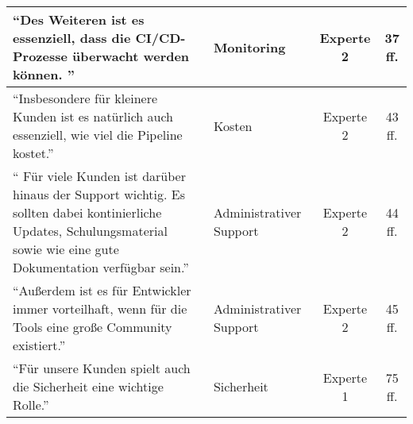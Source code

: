 \begin{longtable}{ |C{6cm}|C{3cm}|c|c| }
        \hline
        \enquote{Des Weiteren ist es essenziell, dass die CI/CD-Prozesse überwacht werden können. } & Monitoring & Experte 2 & 37 ff. \\
        \hline
        \enquote{Insbesondere für kleinere Kunden ist es natürlich auch essenziell, wie viel die Pipeline kostet.} & Kosten & Experte 2 & 43 ff. \\
        \hline
        \enquote{ Für viele Kunden ist darüber hinaus der Support wichtig. Es sollten dabei kontinierliche Updates, Schulungsmaterial sowie wie eine gute Dokumentation verfügbar sein.} & Administrativer Support & Experte 2 & 44 ff. \\
        \hline
        \enquote{Außerdem ist es für Entwickler immer vorteilhaft, wenn für die Tools eine große Community existiert.} & Administrativer Support & Experte 2 & 45 ff. \\
        \hline
        \enquote{Für unsere Kunden spielt auch die Sicherheit eine wichtige Rolle.} & Sicherheit & Experte 1 & 75 ff. \\
        \hline
        
        \end{longtable}

